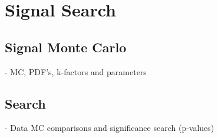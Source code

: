 \chapter{Signal Search }


\section{Signal Monte Carlo }
{\normalsize - MC, PDF's, k-factors and parameters}


\section{Search }
{\normalsize - Data MC comparisons and significance search (p-values)}
